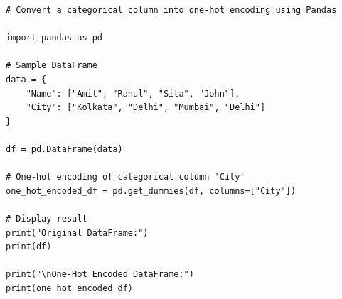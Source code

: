 \begin{verbatim}
# Convert a categorical column into one-hot encoding using Pandas

import pandas as pd

# Sample DataFrame
data = {
    "Name": ["Amit", "Rahul", "Sita", "John"],
    "City": ["Kolkata", "Delhi", "Mumbai", "Delhi"]
}

df = pd.DataFrame(data)

# One-hot encoding of categorical column 'City'
one_hot_encoded_df = pd.get_dummies(df, columns=["City"])

# Display result
print("Original DataFrame:")
print(df)

print("\nOne-Hot Encoded DataFrame:")
print(one_hot_encoded_df)
\end{verbatim}